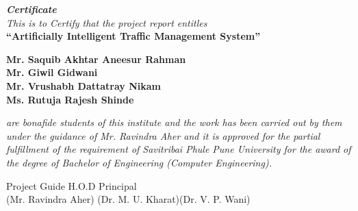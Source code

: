 \documentclass[openany,12pt]{report}
\begin{document}
	\fontsize{14}{16}
	\thispagestyle{empty}
	\begin{center}
		\begin{figure}[h]
			\centerline{}
			\label{atcres}
		\end{figure}
		\vspace{0.1in}
		{\it \Huge  \textbf{Certificate}}
		\vspace{0.2in}\\
		{\it This is to Certify that the project report entitles}\\
		\vspace{0.2in}
		{\Large \bf ``Artificially Intelligent Traffic Management System''}\\
		\vspace{0.2in}
		
		{\bf Mr. Saquib Akhtar Aneesur Rahman}\\
		{\bf Mr. Giwil Gidwani  }\\
		{\bf Mr. Vrushabh Dattatray Nikam     }\\
		{\bf Ms. Rutuja Rajesh Shinde    }\\
	\end{center}
	\vspace{0.3in}
	{\it are bonafide students of this institute and the work has been carried out by them under
		the guidance of Mr. Ravindra Aher and it is approved for the partial fulfillment of the
		requirement of Savitribai Phule Pune University for the award of the degree of Bachelor
		of Engineering (Computer Engineering).}\\
	\vspace{0.2in}
	\vspace{0.7in}
	\noindent
	
	\hspace{0.1in} Project Guide  \hspace{1.5in}H.O.D \hspace{0.9in} Principal  \\
	\hspace{4.6in} (Mr. Ravindra Aher) \hspace{0.6in}(Dr. M. U. Kharat)\hspace{0.4in}(Dr. V. P. Wani)\\
	\vspace{0.2in}
	
\end{document}
